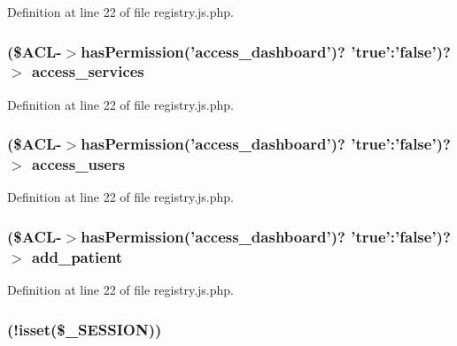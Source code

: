 \-Definition at line 22 of file registry.\-js.\-php.

\hypertarget{registry_8js_8php_a5a0b766315a4c99310a4a0e8c4a7128c}{
\subsubsection[{access\-\_\-services}]{ (\${\bf \-A\-C\-L}-\/$>$has\-Permission('access\-\_\-dashboard')? 'true'\-:'false')?$>$ {\bf access\-\_\-services}}}\label{registry_8js_8php_a5a0b766315a4c99310a4a0e8c4a7128c}


\-Definition at line 22 of file registry.\-js.\-php.

\hypertarget{registry_8js_8php_a733ed137e272d2c496cd21d34f26fd97}{
\subsubsection[{access\-\_\-users}]{ (\${\bf \-A\-C\-L}-\/$>$has\-Permission('access\-\_\-dashboard')? 'true'\-:'false')?$>$ {\bf access\-\_\-users}}}\label{registry_8js_8php_a733ed137e272d2c496cd21d34f26fd97}


\-Definition at line 22 of file registry.\-js.\-php.

\hypertarget{registry_8js_8php_a28f090e727c9c74ce03f8618d5c8f47a}{
\subsubsection[{add\-\_\-patient}]{ (\${\bf \-A\-C\-L}-\/$>$has\-Permission('access\-\_\-dashboard')? 'true'\-:'false')?$>$ {\bf add\-\_\-patient}}}\label{registry_8js_8php_a28f090e727c9c74ce03f8618d5c8f47a}


\-Definition at line 22 of file registry.\-js.\-php.

\hypertarget{registry_8js_8php_a8ceca98aa29914fd2479a84a8d2242fb}{
\subsubsection[{if}]{(!isset(\$\-\_\-\-S\-E\-S\-S\-I\-O\-N))}}\label{registry_8js_8php_a8ceca98aa29914fd2479a84a8d2242fb}


